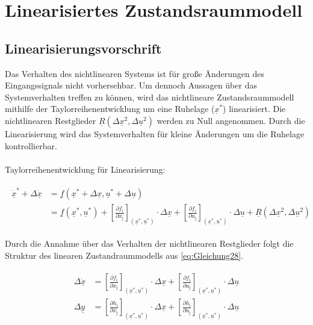\section{Linearisiertes Zustandsraummodell}

\subsection{Linearisierungsvorschrift}

Das Verhalten des nichtlinearen Systems ist für große Änderungen des Eingangssignals nicht vorhersehbar. Um dennoch Aussagen über das Systemverhalten treffen zu können, wird das nichtlineare Zustandsraummodell mithilfe der Taylorreihenentwicklung um eine Ruhelage ($\underline{x}^{*}$) linearisiert. Die nichtlinearen Restglieder $\underline{R}(\Delta{\underline{x}^2}, \Delta{\underline{u}^2})$ werden zu Null angenommen.
Durch die Linearisierung wird das Systemverhalten für kleine Änderungen um die Ruhelage kontrollierbar.\\\\
Taylorreihenentwicklung für Linearisierung:

\begin{align}\label{eq:Gleichung27}
    \begin{split}
        \dot{\underline{x}}^{*}+\Delta{\dot{\underline{x}}} &=\underline{f}(\underline{x}^{*}+\Delta{\underline{x}},\underline{u}^{*}+\Delta{\underline{u}})\\
        &=\underline{f}(\underline{x}^{*},\underline{u}^{*})+\left[\frac{\partial f_{\mathrm{i}}}{\partial x_{\mathrm{j}}}\right]_{(\underline{x}^{*}, \underline{u}^{*})}\cdot\Delta{\underline{x}}+\left[\frac{\partial f_{\mathrm{i}}}{\partial u_{\mathrm{j}}}\right]_{(\underline{x}^{*},\underline{u}^{*})}\cdot\Delta{\underline{u}}+\underline{R}(\Delta{\underline{x}^2}, \Delta{\underline{u}^2})
    \end{split}
\end{align}

Durch die Annahme über das Verhalten der nichtlinearen Restglieder folgt die Struktur des linearen Zustandraummodells aus \autoref{eq:Gleichung28}.

\begin{align}\label{eq:Gleichung28}
    \begin{split}
        \Delta\dot{\underline{x}} &= \left[\frac{\partial f_{\mathrm{i}}}{\partial x_{\mathrm{j}}}\right]_{(\underline{x}^{*}, \underline{u}^{*})}\cdot\Delta{\underline{x}}+\left[\frac{\partial f_{\mathrm{i}}}{\partial u_{\mathrm{j}}}\right]_{(\underline{x}^{*},\underline{u}^{*})}\cdot\Delta{\underline{u}}\\   
        \Delta{\underline{y}} &= \left[\frac{\partial h_{\mathrm{i}}}{\partial x_{\mathrm{j}}}\right]_{(\underline{x}^{*}, \underline{u}^{*})}\cdot\Delta{\underline{x}}+\left[\frac{\partial h_{\mathrm{i}}}{\partial u_{\mathrm{j}}}\right]_{(\underline{x}^{*},\underline{u}^{*})}\cdot\Delta{\underline{u}}
    \end{split}
\end{align}

